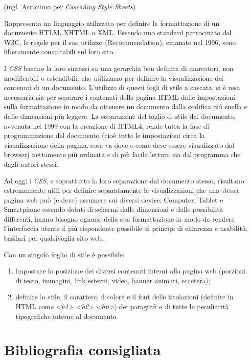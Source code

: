 \documentclass[
  b5paper,
  twoside,
  12pt,
  chapterprefix=false,
  bibliography=totocnumbered,
  parskip=false]{scrbook}
\begin{document}
(ingl. Acronimo per \emph{Cascading Style Sheets})

Rappresenta un linguaggio utilizzato per definire la formattazione di un
documento HTLM, XHTML o XML. Essendo uno standard patrocinato dal W3C,
le regole per il suo utilizzo (Recommendation), emanate nel 1996, sono
liberamente consultabili sul loro sito.

I \emph{CSS} basano la loro sintassi su una gerarchia ben definita di
marcatori, non modificabili o estendibili, che utilizzano per definire
la visualizzazione dei contenuti di un documento. L'utilizzo di questi
fogli di stile a cascata, si è resa necessaria sia per separare i
contenuti della pagina HTML dalle impostazioni sulla formattazione in
modo da ottenere un documento dalla codifica più snella e dalle
dimensioni più leggere. La separazione del foglio di stile dal
documento, avvenuta nel 1999 con la creazione di HTML4, rende tutta la
fase di programmazione del documento (cioè tutte le impostazioni circa
la visualizzazione della pagina, cosa va dove e come deve essere
visualizzato dal browser) nettamente più ordinata e di più facile
lettura sia dal programma che dagli autori stessi.

Ad oggi i \emph{CSS}, e soprattutto la loro separazione dal documento stesso,
risultano estremamente utili per definire separatamente le
visualizzazioni che una stessa pagina web può (e deve) assumere sui
diversi device: Computer, Tablet e Smartphone essendo dotati di schermi
dalle dimensioni e dalle possibilità differenti, hanno bisogno ognuno
della sua formattazione in modo da rendere l'interfaccia utente il più
rispondente possibile ai principi di chiarezza e usabilità, basilari per
qualsivoglia sito web.

Con un singolo foglio di stile è possibile:

\begin{enumerate}
\def\labelenumi{\arabic{enumi}.}
\item
  Impostare la posizione dei diversi contenuti interni alla pagina web
  (porzioni di testo, immagini, link esterni, video, banner animati,
  eccetera);
\item
  definire lo stile, il carattere, il colore e il font delle
  titolazioni (definite in HTML come \emph{\textless h1\textgreater{} \textless h2\textgreater{} \textless hn\textgreater{}}) dei
  paragrafi e di tutte le peculiarità tipografiche interne al
  documento.
\end{enumerate}

\hypertarget{bibliografia-consigliata-4}{%
\section*{Bibliografia consigliata}\label{bibliografia-consigliata-4}}
\end{document}
